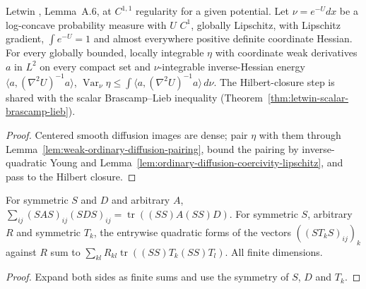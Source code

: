 \begin{lemma}
  \label{lem:letwin-weak-brascamp-lieb}
  \leanok
  Letwin \cite{Letwin2026QuadraticKLS}, Lemma~A.6, at $C^{1,1}$ regularity for a given potential. Let $\nu=e^{-U}dx$ be a log-concave
  probability measure with $U$ $C^1$, globally Lipschitz, with Lipschitz gradient, $\int e^{-U}=1$ and almost everywhere positive definite
  coordinate Hessian. For every globally bounded, locally integrable $\eta$ with coordinate weak derivatives $a$ in $L^2$ on every compact
  set and $\nu$-integrable inverse-Hessian energy $\langle a,(\nabla^2U)^{-1}a\rangle$,
  $\operatorname{Var}_\nu\eta\le\int\langle a,(\nabla^2U)^{-1}a\rangle\,d\nu$. The Hilbert-closure step is shared with the scalar
  Brascamp--Lieb inequality (Theorem~\ref{thm:letwin-scalar-brascamp-lieb}).
\end{lemma}
\begin{proof}
  \leanok
  Centered smooth diffusion images are dense; pair $\eta$ with them through Lemma~\ref{lem:weak-ordinary-diffusion-pairing}, bound the
  pairing by inverse-quadratic Young and Lemma~\ref{lem:ordinary-diffusion-coercivity-lipschitz}, and pass to the Hilbert closure.
\end{proof}

\begin{lemma}
  \label{lem:matrix-product-entry-trace}
  \leanok
  For symmetric $S$ and $D$ and arbitrary $A$, $\sum_{ij}(SAS)_{ij}(SDS)_{ij}=\operatorname{tr}((SS)A(SS)D)$. For symmetric $S$,
  arbitrary $R$ and symmetric $T_k$, the entrywise quadratic forms of the vectors $((ST_kS)_{ij})_k$ against $R$ sum to
  $\sum_{kl}R_{kl}\operatorname{tr}((SS)T_k(SS)T_l)$. All finite dimensions.
\end{lemma}
\begin{proof}
  \leanok
  Expand both sides as finite sums and use the symmetry of $S$, $D$ and $T_k$.
\end{proof}

